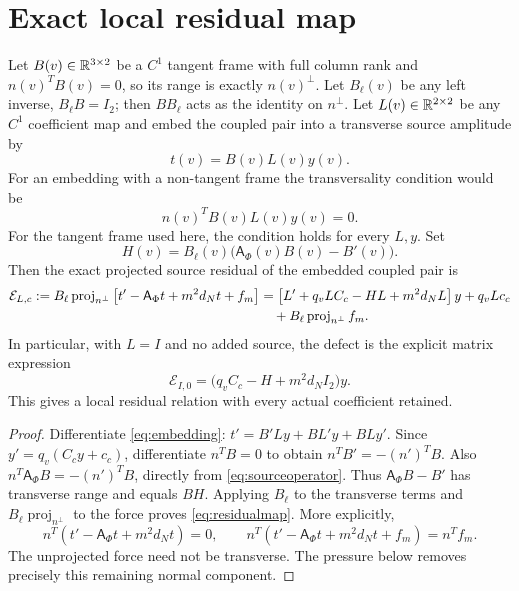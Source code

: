 \section{Exact local residual map}
Let $B(v)\in\mathbb R^{3\times2}$ be a $C^1$ tangent frame with full column rank and
$n(v)^TB(v)=0$, so its range is exactly $n(v)^\perp$.  Let $B_\ell(v)$ be any
left inverse, $B_\ell B=I_2$; then $B B_\ell$ acts as the identity on
$n^\perp$.  Let $L(v)\in\mathbb R^{2\times2}$ be any $C^1$ coefficient map and embed
the coupled pair into a transverse source amplitude by
\begin{equation}
 t(v)=B(v)L(v)y(v).
 \label{eq:embedding}
\end{equation}
For an embedding with a non-tangent frame the transversality condition would be
\begin{equation}
 n(v)^TB(v)L(v)y(v)=0.
 \label{eq:transversecondition}
\end{equation}
For the tangent frame used here, the condition holds for every $L,y$.  Set
\begin{equation}
 H(v)=B_\ell(v)\bigl(\mathsf A_\Phi(v)B(v)-B'(v)\bigr).
 \label{eq:Hdef}
\end{equation}
Then the exact projected source residual of the embedded coupled pair is
\begin{align}
 \mathcal E_{L,c}:=B_\ell\operatorname{proj}_{n^\perp}
 \left[t'-\mathsf A_\Phi t+m^2d_Nt+f_m\right]
 &=\left[L'+q_vLC_c-HL+m^2d_NL\right]y+q_vLc_c \\
 &\quad+B_\ell\operatorname{proj}_{n^\perp}f_m.
 \label{eq:residualmap}
\end{align}
In particular, with $L=I$ and no added source, the defect is the explicit
matrix expression
\begin{equation}
 \mathcal E_{I,0}=\bigl(q_vC_c-H+m^2d_NI_2\bigr)y.
 \label{eq:identitydefect}
\end{equation}
This gives a local residual relation with every actual coefficient retained.

\begin{proof}
Differentiate \eqref{eq:embedding}:
$t'=B'L y+B L'y+B L y'$.  Since $y'=q_v(C_cy+c_c)$,
differentiate $n^TB=0$ to obtain $n^TB'=-(n')^TB$. Also
$n^T\mathsf A_\Phi B=-(n')^TB$, directly from
\eqref{eq:sourceoperator}. Thus $\mathsf A_\Phi B-B'$ has transverse
range and equals $BH$. Applying $B_\ell$ to the transverse terms and
$B_\ell\operatorname{proj}_{n^\perp}$ to the force proves
\eqref{eq:residualmap}. More explicitly,
\begin{equation}
 n^T(t'-\mathsf A_\Phi t+m^2d_Nt)=0,\qquad
 n^T(t'-\mathsf A_\Phi t+m^2d_Nt+f_m)=n^Tf_m.
\end{equation}
The unprojected force need not be transverse. The pressure below removes
precisely this remaining normal component.
\end{proof}

